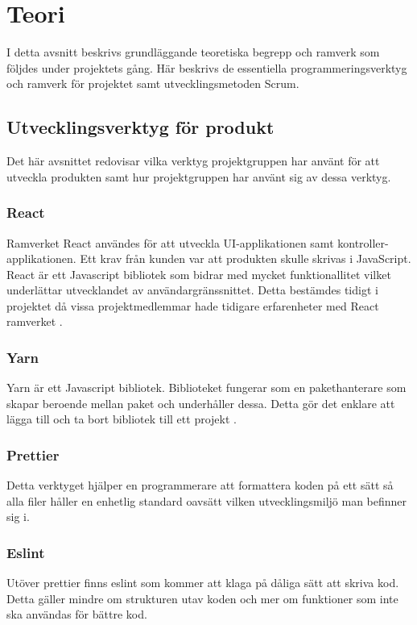 \chapter{Teori}
\label{cha:theory}
I detta avsnitt beskrivs grundläggande teoretiska begrepp och ramverk som följdes under projektets gång. Här beskrivs de essentiella programmeringsverktyg och ramverk för projektet samt utvecklingsmetoden Scrum. 
\section{Utvecklingsverktyg för produkt}
Det här avsnittet redovisar vilka verktyg projektgruppen har använt för att utveckla produkten samt hur projektgruppen har använt sig av dessa verktyg.

\subsection*{React}
Ramverket React användes för att utveckla UI-applikationen samt kontroller-applikationen. Ett krav från kunden var att produkten skulle skrivas i JavaScript. React är ett Javascript bibliotek som bidrar med mycket funktionallitet vilket underlättar utvecklandet av användargränssnittet.  Detta bestämdes tidigt i projektet då vissa projektmedlemmar hade tidigare erfarenheter med React ramverket \cite{ReactAJa67:online}.

\subsection*{Yarn}
Yarn är ett Javascript bibliotek. Biblioteket fungerar som en pakethanterare som skapar beroende mellan paket och underhåller dessa. Detta gör det enklare att lägga till och ta bort bibliotek till ett projekt \cite{GettingS85:online}.

\subsection*{Prettier}
Detta verktyget hjälper en programmerare att formattera koden på ett sätt så alla filer håller en enhetlig standard oavsätt vilken utvecklingsmiljö man befinner sig i.

\subsection*{Eslint}
Utöver prettier finns eslint som kommer att klaga på dåliga sätt att skriva kod. Detta gäller mindre om strukturen utav koden och mer om funktioner som inte ska användas för bättre kod.

